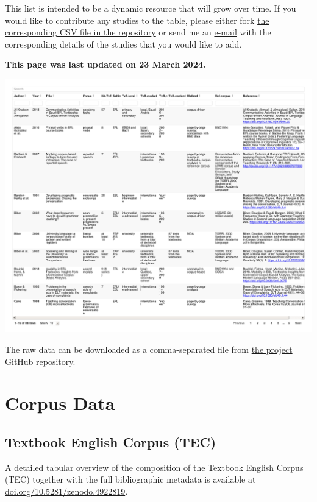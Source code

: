 \documentclass[
  letterpaper,
  DIV=11,
  numbers=noendperiod]{scrreprt}
\begin{document}
This list is intended to be a dynamic resource that will grow over time.
If you would like to contribute any studies to the table, please either
fork
\href{https://github.com/elenlefoll/TextbookEnglish/blob/main/LitReviewTable.csv}{the
corresponding CSV file in the repository} or send me an
\href{mailto:elefoll@uni-koeln.de?subject=\%5BLitReviewTable\%5D\%20Suggestions}{e-mail}
with the corresponding details of the studies that you would like to
add.

\textbf{This page was last updated on 23 March 2024.}

\includegraphics{AppendixA_files/figure-pdf/display-1.pdf}

The raw data can be downloaded as a comma-separated file from
\href{https://github.com/elenlefoll/TextbookMDA}{the project GitHub
repository}.

\chapter{Corpus Data}\label{corpus-data}

\section{Textbook English Corpus
(TEC)}\label{textbook-english-corpus-tec}

A detailed tabular overview of the composition of the Textbook English
Corpus (TEC) together with the full bibliographic metadata is available
at
\href{https://doi.org/10.5281/zenodo.4922819}{doi.org/10.5281/zenodo.4922819}.
\end{document}
